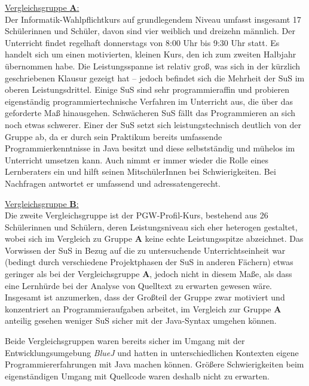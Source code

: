\documentclass[paper=a4, DIV=13, BCOR=12mm, twoside=on, onecolumn=on, open = any, titlepage =on, parskip =half-, headsepline = on, footsepline = on, chapterprefix = on, sectionprefix = on, appendixprefix = off, fontsize = 11pt, numbers = noenddot, abstract = off]{scrreprt}
\begin{document}
\underline{Vergleichsgruppe \textsc{\textbf{A}}:}\\
Der Informatik-Wahlpflichtkurs auf grundlegendem Niveau umfasst insgesamt 17 Schülerinnen und Schüler, davon sind vier weiblich und dreizehn männlich. Der Unterricht findet regelhaft donnerstags von 8:00 Uhr bis 9:30 Uhr statt. 
Es handelt sich um einen motivierten, kleinen Kurs, den ich zum zweiten Halbjahr übernommen habe. Die Leistungsspanne ist relativ groß, was sich in der kürzlich geschriebenen Klausur gezeigt hat – jedoch befindet sich die Mehrheit der SuS im oberen Leistungsdrittel. Einige SuS sind sehr programmieraffin und probieren eigenständig programmiertechnische Verfahren im Unterricht aus, die über das geforderte Maß hinausgehen. Schwächeren SuS fällt das Programmieren an sich noch etwas schwerer. Einer der SuS setzt sich leistungstechnisch deutlich von der Gruppe ab, da er durch sein Praktikum bereits umfassende Programmierkenntnisse in Java besitzt und diese selbstständig und mühelos im Unterricht umsetzen kann. Auch nimmt er immer wieder die Rolle eines Lernberaters ein und hilft seinen MitschülerInnen bei Schwierigkeiten. Bei Nachfragen antwortet er umfassend und adressatengerecht.

\underline{Vergleichsgruppe \textsc{\textbf{B}}:}\\
Die zweite Vergleichsgruppe ist der PGW-Profil-Kurs, bestehend aus 26 Schülerinnen und Schülern, deren Leistungsniveau sich eher heterogen gestaltet, wobei sich im Vergleich zu Gruppe \textsc{\textbf{A}} keine echte Leistungsspitze abzeichnet. Das Vorwissen der SuS in Bezug auf die zu untersuchende Unterrichtseinheit war (bedingt durch verschiedene Projektphasen der SuS in anderen Fächern) etwas geringer als bei der Vergleichsgruppe \textsc{\textbf{A}}, jedoch nicht in diesem Maße, als dass eine Lernhürde bei der Analyse von Quelltext zu erwarten gewesen wäre. Insgesamt ist anzumerken, dass der Großteil der Gruppe zwar motiviert und konzentriert an Programmieraufgaben arbeitet, im Vergleich zur Gruppe \textsc{\textbf{A}} anteilig gesehen weniger SuS sicher mit der Java-Syntax umgehen können. 

Beide Vergleichsgruppen waren bereits sicher im Umgang mit der Entwicklungsumgebung \emph{BlueJ} und hatten in unterschiedlichen Kontexten eigene Programmiererfahrungen mit Java machen können. Größere Schwierigkeiten beim eigenständigen Umgang mit Quellcode waren deshalb nicht zu erwarten.
\end{document}
